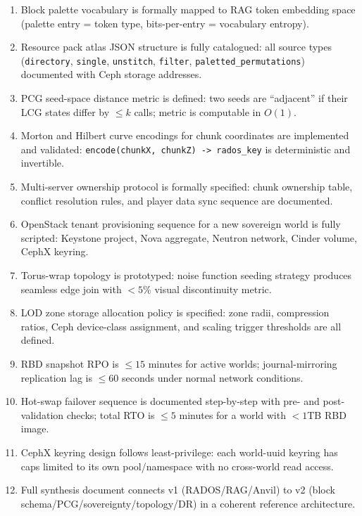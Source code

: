 \documentclass[11pt,letterpaper]{article}
\begin{document}
\begin{enumerate}
  \item Block palette vocabulary is formally mapped to RAG token embedding space (palette entry = token type, bits-per-entry = vocabulary entropy).
  \item Resource pack atlas JSON structure is fully catalogued: all source types (\texttt{directory}, \texttt{single}, \texttt{unstitch}, \texttt{filter}, \texttt{paletted\_permutations}) documented with Ceph storage addresses.
  \item PCG seed-space distance metric is defined: two seeds are ``adjacent'' if their LCG states differ by $\leq k$ calls; metric is computable in $O(1)$.
  \item Morton and Hilbert curve encodings for chunk coordinates are implemented and validated: \texttt{encode(chunkX, chunkZ) -> rados\_key} is deterministic and invertible.
  \item Multi-server ownership protocol is formally specified: chunk ownership table, conflict resolution rules, and player data sync sequence are documented.
  \item OpenStack tenant provisioning sequence for a new sovereign world is fully scripted: Keystone project, Nova aggregate, Neutron network, Cinder volume, CephX keyring.
  \item Torus-wrap topology is prototyped: noise function seeding strategy produces seamless edge join with $< 5\%$ visual discontinuity metric.
  \item LOD zone storage allocation policy is specified: zone radii, compression ratios, Ceph device-class assignment, and scaling trigger thresholds are all defined.
  \item RBD snapshot RPO is $\leq 15$ minutes for active worlds; journal-mirroring replication lag is $\leq 60$ seconds under normal network conditions.
  \item Hot-swap failover sequence is documented step-by-step with pre- and post-validation checks; total RTO is $\leq 5$ minutes for a world with $< 1$TB RBD image.
  \item CephX keyring design follows least-privilege: each world-uuid keyring has caps limited to its own pool/namespace with no cross-world read access.
  \item Full synthesis document connects v1 (RADOS/RAG/Anvil) to v2 (block schema/PCG/sovereignty/topology/DR) in a coherent reference architecture.
\end{enumerate}
\end{document}
